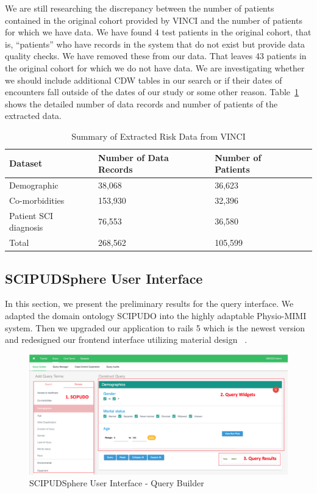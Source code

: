 \documentclass{amia}
\begin{document}
We are still researching the discrepancy between the number of patients contained in the original cohort provided by VINCI and the number of patients for which we have data.  We have found 4 test patients in the original cohort, that is, ``patients'' who have records in the system that do not exist but provide data quality checks.  We have removed these from our data.  That leaves 43 patients in the original cohort for which we do not have data.  We are investigating whether we should include additional CDW tables in our search or if their dates of encounters fall outside of the dates of our study or some other reason. Table~\ref{summary} shows the detailed number of data records and number of patients of the extracted data.

\begin{table}[!ht]
\centering
\caption{Summary of Extracted Risk Data from VINCI}
  \begin{tabular}{|l|l|l|l|}
  \hline
    \textbf{Dataset}  & \textbf{Number of Data Records} & \textbf{Number of Patients} \\ \hline
    Demographic            &  38,068  & 36,623 \\ \hline
    Co-morbidities         & 153,930  & 32,396 \\ \hline
    Patient SCI diagnosis  &  76,553  & 36,580 \\ \hline
    Total & 268,562 & 105,599 \\ \hline
  \end{tabular}
  \label{summary}
\end{table}

\subsection{SCIPUDSphere User Interface}
In this section, we present the preliminary results for the query interface. We adapted the domain ontology SCIPUDO into the highly adaptable Physio-MIMI system. Then we upgraded our application to rails 5 which is the newest version and redesigned our frontend interface utilizing material design ~\cite{material}. 

\begin{figure}[h!]
  \centering
  \includegraphics[scale=0.4]{pics/interface.png}
  \caption{SCIPUDSphere User Interface - Query Builder}
  \label{interface}
\end{figure}
\end{document}
